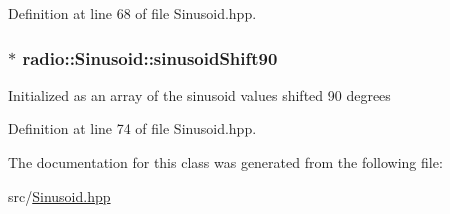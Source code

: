Definition at line 68 of file Sinusoid.\+hpp.

\hypertarget{classradio_1_1Sinusoid_a556db1dca1d5af3d9c6ba2d51f9e3cf8}{
\subsubsection[{sinusoid\+Shift90}]{$\ast$ radio\+::\+Sinusoid\+::sinusoid\+Shift90\hspace{0.3cm}{\ttfamily [protected]}}}\label{classradio_1_1Sinusoid_a556db1dca1d5af3d9c6ba2d51f9e3cf8}
Initialized as an array of the sinusoid values shifted 90 degrees 

Definition at line 74 of file Sinusoid.\+hpp.



The documentation for this class was generated from the following file\+:\begin{DoxyCompactItemize}
\item 
src/\hyperlink{Sinusoid_8hpp}{Sinusoid.\+hpp}\end{DoxyCompactItemize}
